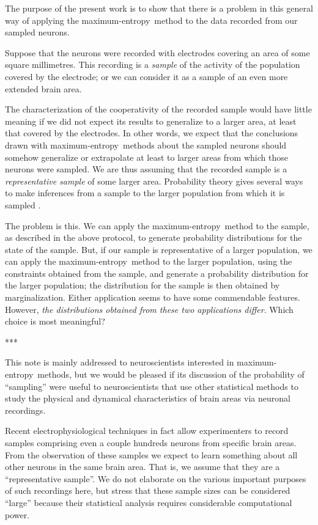 \documentclass{article}
\theoremstyle{remark}
\theoremstyle{innote}
\newcommand*{\citep}{\parencites}
\renewcommand*{\cite}{\citep}
\renewcommand*{\|}{\mathpunct{|}}%
\newcommand*{\chap}{ch.}%
\theoremstyle{simple}
\newcommand*{\me}{maximum-entropy}
\begin{document}
The purpose of the present work is to show that there is a problem in this
general way of applying the \me\ method to the data recorded from our
sampled neurons.

Suppose that the neurons were recorded with electrodes covering an area of
some square millimetres. This recording is a \emph{sample} of the activity
of the population covered by the electrode; or we can consider it as a
sample of an even more extended brain area.

The characterization of the cooperativity of the recorded sample would have
little meaning if we did not expect its results to generalize to a larger
area, at least that covered by the electrodes. In other words, we expect
that the conclusions drawn with \me\ methods about the sampled neurons
should somehow generalize or extrapolate at least to larger areas from
which those neurons were sampled. We are thus assuming that the recorded
sample is a \emph{representative sample} of some larger area. Probability
theory gives several ways to make inferences from a sample to the larger
population from which it is sampled
\cites{ghoshetal1997}[parts~I,VI]{freedmanetal1978_r2007}[\chap~8]{gelmanetal1995_r2014}[\chap~3]{jaynes1994_r2003}.

The problem is this. We can apply the \me\ method to the sample, as
described in the above protocol, to generate probability distributions for
the state of the sample. But, if our sample is representative of a larger
population, we can apply the \me\ method to the larger population, using
the constraints obtained from the sample, and generate a probability
distribution for the larger population; the distribution for the sample is
then obtained by marginalization. Either application seems to have some
commendable features. However, \emph{the distributions obtained from these
  two applications differ}. Which choice is most meaningful?

***

This note is mainly addressed to neuroscientists interested in \me\
methods, but we would be pleased if its discussion of the probability of
\enquote{sampling} were useful to neuroscientists that use other
statistical methods to study the physical and dynamical characteristics of
brain areas via neuronal recordings.

Recent electrophysiological techniques \cite{berenyietal2014} in fact allow
experimenters to record samples comprising even a couple hundreds neurons
from specific brain areas. From the observation of these samples we expect
to learn something about all other neurons in the same brain area. That is,
we assume that they are a \enquote{representative sample}. We do not
elaborate on the various important purposes of such recordings here, but
stress that these sample sizes can be considered \enquote{large} because
their statistical analysis requires considerable computational power.
\end{document}
